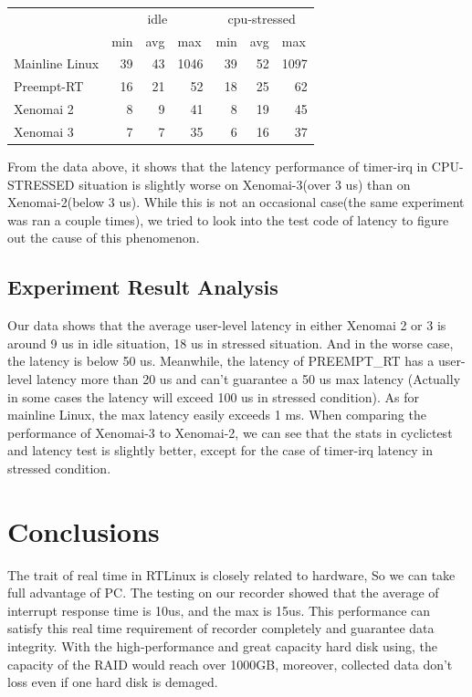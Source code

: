 \documentclass[10pt,a4paper]{article}
\begin{document}
\begin{multicols}{2}
\begin{tabular}{|l|r|r|r|r|r|r|}
\hline
\multirow{2}{*}{} & \multicolumn{3}{c|}{idle} & \multicolumn{3}{c|}{cpu-stressed} \\ \cline{2-7} 
 & \multicolumn{1}{l|}{min} & \multicolumn{1}{l|}{avg} & \multicolumn{1}{l|}{max} & \multicolumn{1}{l|}{min} & \multicolumn{1}{l|}{avg} & \multicolumn{1}{l|}{max} \\ \hline
Mainline Linux & 39 & 43 & 1046 & 39 & 52 & 1097 \\ \hline
Preempt-RT & 16 & 21 & 52 & 18 & 25 & 62 \\ \hline
Xenomai 2 & 8 & 9 & 41 & 8 & 19 & 45 \\ \hline
Xenomai 3 & 7 & 7 & 35 & 6 & 16 & 37 \\ \hline
\end{tabular}


From the data above, it shows that the latency performance of timer-irq in CPU-STRESSED situation is slightly worse on Xenomai-3(over 3 us) than on Xenomai-2(below 3 us). While this is not an occasional case(the same experiment was ran a couple times), we tried to look into the test code of latency to figure out the cause of this phenomenon.

\subsection{Experiment Result Analysis}
Our data shows that the average user-level latency in either Xenomai 2 or 3 is around 9 us in idle situation, 18 us in stressed situation. And in the worse case, the latency is below 50 us. Meanwhile, the latency of PREEMPT\_RT has a user-level latency more than 20 us and can't guarantee a 50 us max latency (Actually in some cases the latency will exceed 100 us in stressed condition).  As for mainline Linux, the max latency easily exceeds 1 ms. When comparing the performance of Xenomai-3 to Xenomai-2, we can see that the stats in cyclictest and latency test is slightly better, except for the case of timer-irq latency in stressed condition.

\section{Conclusions}
The trait of real time in RTLinux is closely related to hardware, So we can take full advantage of PC. The testing on our recorder showed that the average of interrupt response time is 10us, and the max  is 15us. This performance can satisfy this real time requirement of recorder completely and guarantee data integrity. With the high-performance and  great capacity hard disk using, the capacity of the RAID would reach over 1000GB, moreover, collected data don't loss even if one hard disk is demaged.


\end{multicols}
\end{document}
